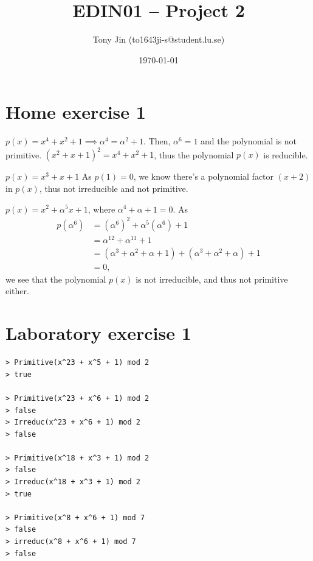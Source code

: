 \documentclass{article}
\theoremstyle{definition}
\theoremstyle{definition}
\theoremstyle{definition}
\begin{document}
\title{EDIN01 -- Project 2}
\author{Tony Jin (to1643ji-s@student.lu.se)}
\date{\today}
\maketitle


\section{Home exercise 1}
$p(x) = x^4 + x^2 + 1 \implies \alpha^4 = \alpha^2 + 1$. Then, $\alpha^6 = 1$ and the polynomial is not primitive.
$(x^2 + x + 1)^2 = x^4 + x^2 + 1$, thus the polynomial $p(x)$ is reducible.

$p(x) = x^3 + x + 1$ As $p(1) = 0$, we know there's a polynomial factor $(x + 2)$ in $p(x)$, thus not irreducible and not primitive.

$p(x) = x^2 + \alpha^5x + 1$, where $\alpha^4 + \alpha + 1 = 0$. As
\begin{align*}
p(\alpha^6) &= (\alpha^6)^2 + \alpha^5(\alpha^6) + 1 \\
&= \alpha^{12} + \alpha^{11} + 1 \\
&= (\alpha^3 + \alpha^2 + \alpha + 1) + (\alpha^3 + \alpha^2 + \alpha) + 1 \\
&= 0,
\end{align*}
we see that the polynomial $p(x)$ is not irreducible, and thus not primitive either.

\section{Laboratory exercise 1}
\begin{verbatim}
> Primitive(x^23 + x^5 + 1) mod 2
> true

> Primitive(x^23 + x^6 + 1) mod 2
> false
> Irreduc(x^23 + x^6 + 1) mod 2
> false

> Primitive(x^18 + x^3 + 1) mod 2
> false
> Irreduc(x^18 + x^3 + 1) mod 2
> true

> Primitive(x^8 + x^6 + 1) mod 7
> false
> irreduc(x^8 + x^6 + 1) mod 7
> false
\end{verbatim}
\end{document}
